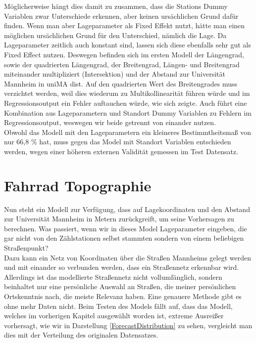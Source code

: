 \documentclass[a4paper,12pt]{thesis}
\begin{document}
Möglicherweise hängt dies damit zu zusammen, dass die Stations Dummy Variablen zwar Unterschiede erkennen, aber keinen ursächlichen Grund dafür finden. Wenn man aber Lageparameter als Fixed Effekt nutzt, hätte man einen möglichen ursächlichen Grund für den Unterschied, nämlich die Lage. Da Lageparameter zeitlich auch konstant sind, lassen sich diese ebenfalls sehr gut als Fixed Effect nutzen. Deswegen befinden sich im ersten Modell der Längengrad, sowie der quadrierten Längengrad, der Breitengrad, Längen- und Breitengrad miteinander multipliziert (Intersektion) und der Abstand zur Universität Mannheim in \glqq uniMA dist\grqq. Auf den quadrierten Wert des Breitengrades muss verzichtet werden, weil dies wiederum zu Multikollinearität führen würde und im Regressionsoutput ein Fehler auftauchen würde, wie sich zeigte. Auch führt eine Kombination aus Lageparametern und Standort Dummy Variablen zu Fehlern im Regressionsoutput, weswegen wir beide getrennt von einander nutzen.\\
Obwohl das Modell mit den Lageparametern ein kleineres Bestimmtheitsmaß von nur 66,8 \% hat, muss gegen das Model mit Standort Variablen entschieden werden, wegen einer höheren externen Validität gemessen im Test Datensatz.

\section{Fahrrad Topographie}

Nun steht ein Modell zur Verfügung, dass auf Lagekoordinaten und den Abstand zur Universität Mannheim in Metern zurückgreift, um seine Vorhersagen zu berechnen. Was passiert, wenn wir in dieses Model Lageparameter eingeben, die gar nicht von den Zählstationen selbst stammten sondern von einem beliebigen Straßenpunkt?\\
Dazu kann ein Netz von Koordinaten über die Straßen Mannheims gelegt werden und mit einander so verbunden werden, dass ein Straßennetz erkennbar wird. Allerdings ist das modellierte Straßennetz nicht vollumfänglich, sondern beinhaltet nur eine persönliche Auswahl an Straßen, die meiner persönlichen Ortskenntnis nach, die meiste Relevanz haben. Eine genauere Methode gibt es ohne mehr Daten nicht. Beim Testen des Models fällt auf, dass das Modell, welches im vorherigen Kapitel ausgewählt worden ist, extreme Ausreißer vorhersagt, wie wir in Darstellung \ref{ForecastDistribution} zu sehen, vergleicht man dies mit der Verteilung des originalen Datensatzes. 
\end{document}
